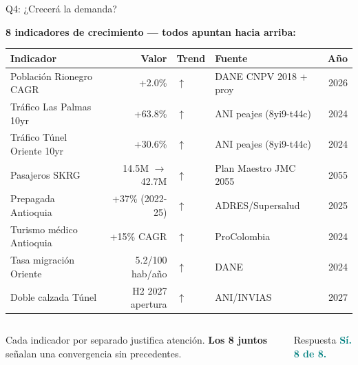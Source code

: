 \documentclass[aspectratio=169, 11pt]{beamer}
\newcommand{\highlight}[1]{\textcolor{teal}{\textbf{#1}}}
\begin{document}
\begin{frame}{Q4: ¿Crecerá la demanda?}

\begin{center}
{\small\textbf{8 indicadores de crecimiento --- todos apuntan hacia arriba:}}
\end{center}

\vspace{4pt}
{\scriptsize
\begin{tabular}{@{}p{3.5cm}rllr@{}}
\toprule
\textbf{Indicador} & \textbf{Valor} & \textbf{Trend} & \textbf{Fuente} & \textbf{Año} \\
\midrule
\rowcolor{teal!6}
Población Rionegro CAGR & +2.0\% & $\uparrow$ & DANE CNPV 2018 + proy & 2026 \\
Tráfico Las Palmas 10yr & +63.8\% & $\uparrow$ & ANI peajes (8yi9-t44c) & 2024 \\
\rowcolor{teal!6}
Tráfico Túnel Oriente 10yr & +30.6\% & $\uparrow$ & ANI peajes (8yi9-t44c) & 2024 \\
Pasajeros SKRG & 14.5M $\to$ 42.7M & $\uparrow$ & Plan Maestro JMC 2055 & 2055 \\
\rowcolor{teal!6}
Prepagada Antioquia & +37\% (2022-25) & $\uparrow$ & ADRES/Supersalud & 2025 \\
Turismo médico Antioquia & +15\% CAGR & $\uparrow$ & ProColombia & 2024 \\
\rowcolor{teal!6}
Tasa migración Oriente & 5.2/100 hab/año & $\uparrow$ & DANE & 2024 \\
Doble calzada Túnel & H2 2027 apertura & $\uparrow$ & ANI/INVIAS & 2027 \\
\bottomrule
\end{tabular}
}

\vspace{6pt}
\begin{columns}[T]
{\footnotesize Cada indicador por separado justifica atención. \textbf{Los 8 juntos} señalan una convergencia sin precedentes.}

\begin{exampleblock}{\small Respuesta}
\centering\large
\highlight{Sí. 8 de 8.}
\end{exampleblock}
\end{columns}
\end{frame}
\end{document}

